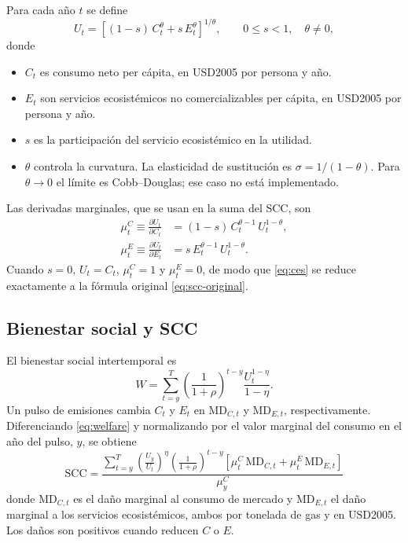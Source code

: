 \documentclass[11pt,a4paper]{article}
\begin{document}
Para cada año \(t\) se define
\begin{equation}
  U_t = \left[(1-s)\,C_t^{\theta} + s\,E_t^{\theta}\right]^{1/\theta},
  \qquad 0 \le s < 1,\quad \theta \neq 0,
  \label{eq:ces}
\end{equation}
donde
\begin{itemize}
  \item \(C_t\) es consumo neto per cápita, en USD2005 por persona y año.
  \item \(E_t\) son servicios ecosistémicos no comercializables per cápita,
        en USD2005 por persona y año.
  \item \(s\) es la participación del servicio ecosistémico en la utilidad.
  \item \(\theta\) controla la curvatura. La elasticidad de sustitución es
        \(\sigma = 1/(1-\theta)\). Para \(\theta \to 0\) el límite es
        Cobb--Douglas; ese caso no está implementado.
\end{itemize}

Las derivadas marginales, que se usan en la suma del SCC, son
\begin{align}
  \mu^C_t \equiv \frac{\partial U_t}{\partial C_t}
  &= (1-s)\,C_t^{\theta-1}\,U_t^{1-\theta},
  \label{eq:muC}\\
  \mu^E_t \equiv \frac{\partial U_t}{\partial E_t}
  &= s\,E_t^{\theta-1}\,U_t^{1-\theta}.
  \label{eq:muE}
\end{align}
Cuando \(s=0\), \(U_t=C_t\), \(\mu^C_t=1\) y \(\mu^E_t=0\), de modo que
\eqref{eq:ces} se reduce exactamente a la fórmula original
\eqref{eq:scc-original}.

\subsection{Bienestar social y SCC}

El bienestar social intertemporal es
\begin{equation}
  W = \sum_{t=y}^{T}
      \left(\frac{1}{1+\rho}\right)^{t-y}
      \frac{U_t^{1-\eta}}{1-\eta}.
  \label{eq:welfare}
\end{equation}
Un pulso de emisiones cambia \(C_t\) y \(E_t\) en
\(\mathrm{MD}_{C,t}\) y \(\mathrm{MD}_{E,t}\), respectivamente. Diferenciando
\eqref{eq:welfare} y normalizando por el valor marginal del consumo en el año
del pulso, \(y\), se obtiene
\begin{equation}
  \boxed{
  \mathrm{SCC} =
  \frac{
    \displaystyle\sum_{t=y}^{T}
    \left(\frac{U_y}{U_t}\right)^{\eta}
    \left(\frac{1}{1+\rho}\right)^{t-y}
    \left[\mu^C_t\,\mathrm{MD}_{C,t}
        + \mu^E_t\,\mathrm{MD}_{E,t}\right]
  }{
    \mu^C_y
  }}
  \label{eq:scc-ces}
\end{equation}
donde \(\mathrm{MD}_{C,t}\) es el daño marginal al consumo de mercado y
\(\mathrm{MD}_{E,t}\) el daño marginal a los servicios ecosistémicos, ambos
por tonelada de gas y en USD2005. Los daños son positivos cuando reducen
\(C\) o \(E\).
\end{document}
